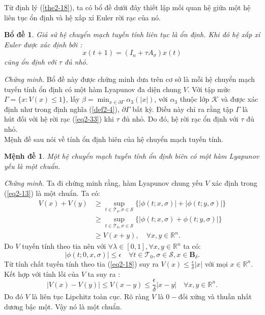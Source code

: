 \documentclass[14pt,a4paper,oneside]{report}		%
\newtheorem{lemma}[theorem]{Bổ đề}
\newtheorem{proposition}[theorem]{Mệnh đề}
\theoremstyle{definition}
\begin{document}
Từ định lý (\ref{the2-18}), ta có bổ đề dưới đây thiết lập mối quan hệ giữa một hệ liên tục ổn định và hệ xấp xỉ Euler rời rạc của nó.

\begin{lemma} \label{le2-19}
Giả sử hệ chuyển mạch tuyến tính liên tục là ổn định. Khi đó hệ xấp xỉ Euler được xác định bởi :
\begin{equation} \label{eq2-33}
x(t+1)=(I_n+\tau A_\sigma)x(t)
\end{equation}
cũng ổn định với $\tau$ đủ nhỏ.
\end{lemma}
\textit{Chứng minh.} Bổ đề này được chứng minh dưa trên cơ sở là mỗi hệ chuyển mạch tuyến tính ổn định có một hàm Lyapunov đa diện chung $V$. Với tập mức $\Gamma =\{x:V(x)\leq 1\}$, lấy $\beta = \min_{x\in\partial\Gamma}\alpha_3(|x|)$, với $\alpha_3$ thuộc lớp $\mathcal{K}$ và được xác định như trong định nghĩa (\ref{def2-4}), $\partial\Gamma$ bất kỳ. Điều này chỉ ra rằng tập $\Gamma$ là hút đối với hệ rời rạc (\ref{eq2-33}) khi $\tau$ đủ nhỏ. Do đó, hệ rời rạc ổn định với $\tau$ đủ nhỏ.\\

Mệnh đề sau nói về tính ổn định biên của hệ chuyển mạch tuyến tính.

\begin{proposition} \label{pro2-21}
Một hệ chuyển mạch tuyến tính ổn định biên có một hàm Lyapunov yếu là một chuẩn.
\end{proposition}

\textit{Chứng minh.} Ta đi chứng minh rằng, hàm Lyapunov chung yếu $V$ xác định trong (\ref{eq2-13}) là một chuẩn. Ta có:
\begin{equation}
\begin{split}
V(x)+V(y) & \geq \sup_{t\in\mathcal{T}_0,\sigma\in\mathcal{S}}\{|\phi(t;x,\sigma)|+|\phi(t;y,\sigma)|\}\\
& \geq \sup_{t\in\mathcal{T}_0,\sigma\in\mathcal{S}}\{|\phi(t;x,\sigma)+\phi(t;y,\sigma)|\}\\
& \geq V(x+y),\quad\forall x,y\in\mathbb{R}^n.
\end{split}
\end{equation}
Do $V$ tuyến tính theo tia nên với $\forall\lambda\in[0,1],\forall x,y\in\mathbb{R}^n$ ta có:
$$|\phi(t;0,x,\sigma)|\leq\epsilon\quad\forall t\in\mathcal{T}_0,\sigma\in\mathcal{S},x\in\mathbf{B}_\delta.$$
Từ tính chất tuyến tính theo tia (\ref{eq2-18}) suy ra $V(x)\leq\frac{\epsilon}{\delta}|x|$ với mọi $x\in\mathbb{R}^n$.\\
Kết hợp với tính lồi của $V$ ta suy ra :
$$|V(x)-V(y)|\leq V(x-y)\leq \frac{\epsilon}{\delta}|x-y|\quad\forall x,y\in\mathbb{R}^n.$$
Do đó $V$ là liên tục Lipchitz toàn cục. Rõ ràng $V$ là $0-$đối xứng và thuần nhất dương bậc một. Vậy nó là một chuẩn.\\
\end{document}
